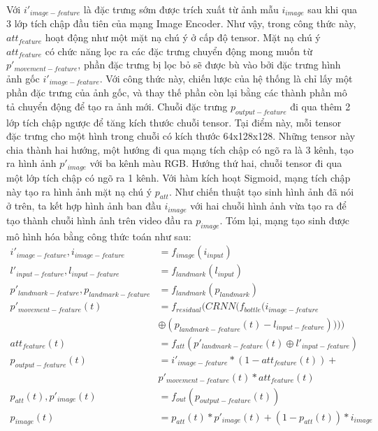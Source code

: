 Với $i'_{image-feature}$ là đặc trưng sớm được trích xuất từ ảnh mẫu $i_{image}$ sau khi qua 3 lớp tích chập đầu tiên của mạng Image Encoder. Như vậy, trong công thức này, $att_{feature}$ hoạt động như một mặt nạ chú ý ở cấp độ tensor. Mặt nạ chú ý $att_{feature}$ có chức năng lọc ra các đặc trưng chuyển động mong muốn từ $p'_{movement-feature}$, phần đặc trưng bị lọc bỏ sẽ được bù vào bởi đặc trưng hình ảnh gốc $i'_{image-feature}$. Với công thức này, chiến lược của hệ thống là chỉ lấy một phần đặc trưng của ảnh gốc, và thay thế phần còn lại bằng các thành phần mô tả chuyển động để tạo ra ảnh mới. Chuỗi đặc trưng $p_{output-feature}$ đi qua thêm 2 lớp tích chập ngược để tăng kích thước chuỗi tensor. Tại điểm này, mỗi tensor đặc trưng cho một hình trong chuỗi có kích thước 64x128x128. Những tensor này chia thành hai hướng, một hướng đi qua mạng tích chập có ngõ ra là 3 kênh, tạo ra hình ảnh $p'_{image}$ với ba kênh màu RGB. Hướng thứ hai, chuỗi tensor đi qua một lớp tích chập có ngõ ra 1 kênh. Với hàm kích hoạt Sigmoid, mạng tích chập này tạo ra hình ảnh mặt nạ chú ý $p_{att}$. Như chiến thuật tạo sinh hình ảnh đã nói ở trên, ta kết hợp hình ảnh ban đầu $i_{image}$ với hai chuỗi hình ảnh vừa tạo ra để tạo thành chuỗi hình ảnh trên video đầu ra $p_{image}$. Tóm lại, mạng tạo sinh được mô hình hóa bằng công thức toán như sau:
\begin{equation}
    \begin{split}
    i'_{image-feature}, i_{image-feature} &= f_{image}(i_{input})\\
    l'_{input-feature}, l_{input-feature} &= f_{landmark}(l_{input})\\
    p'_{landmark-feature}, p_{landmark-feature} &= f_{landmark}(p_{landmark})\\
    p'_{movement-feature}(t) &= f_{residual}(CRNN(f_{bottle}(i_{image-feature} \\
    &\oplus (p_{landmark-feature}(t)-l_{input-feature}))))\\
    att_{feature}(t) &= f_{att}(p'_{landmark-feature}(t) \oplus l'_{input-feature})\\
    p_{output-feature}(t) &= i'_{image-feature}*(1-att_{feature}(t))+\\
    &p'_{movement-feature}(t)*att_{feature}(t)\\
    p_{att}(t), p'_{image}(t) &= f_{out}(p_{output-feature}(t))\\
    p_{image}(t) &= p_{att}(t)*p'_{image}(t)+(1-p_{att}(t))*i_{image}
    \end{split}
\end{equation}

